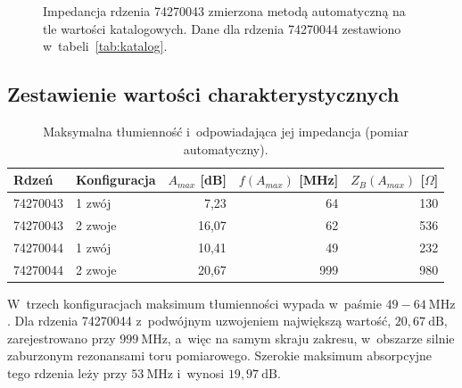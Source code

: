 \documentclass[11pt,a4paper]{article}
\begin{document}
\begin{figure}[htb]
  \centering
  \caption{Impedancja rdzenia 74270043 zmierzona metodą automatyczną na tle wartości
           katalogowych. Dane dla rdzenia 74270044 zestawiono w~tabeli~\ref{tab:katalog}.}
  \label{fig:katalog}
\end{figure}

\subsection{Zestawienie wartości charakterystycznych}

\begin{table}[H]
  \centering
  \small
  \caption{Maksymalna tłumienność i~odpowiadająca jej impedancja (pomiar automatyczny).}
  \label{tab:maksima}
  \renewcommand{\arraystretch}{1.15}
  \begin{tabular}{|l|l|r|r|r|}
    \hline
    \textbf{Rdzeń} & \textbf{Konfiguracja} & $A_{max}$ [dB] & $f(A_{max})$ [MHz] & $Z_B(A_{max})$ [$\Omega$] \\
    \hline
    74270043 & 1 zwój  & 7,23  & 64  & 130 \\
    \hline
    74270043 & 2 zwoje & 16,07 & 62  & 536 \\
    \hline
    74270044 & 1 zwój  & 10,41 & 49  & 232 \\
    \hline
    74270044 & 2 zwoje & 20,67 & 999 & 980 \\
    \hline
  \end{tabular}
\end{table}

W~trzech konfiguracjach maksimum tłumienności wypada w~paśmie $49-64\ \mathrm{MHz}$.
Dla rdzenia 74270044 z~podwójnym uzwojeniem największą wartość, $20{,}67\ \mathrm{dB}$,
zarejestrowano przy $999\ \mathrm{MHz}$, a~więc na samym skraju zakresu, w~obszarze
silnie zaburzonym rezonansami toru pomiarowego. Szerokie maksimum absorpcyjne tego
rdzenia leży przy $53\ \mathrm{MHz}$ i~wynosi $19{,}97\ \mathrm{dB}$.
\end{document}
